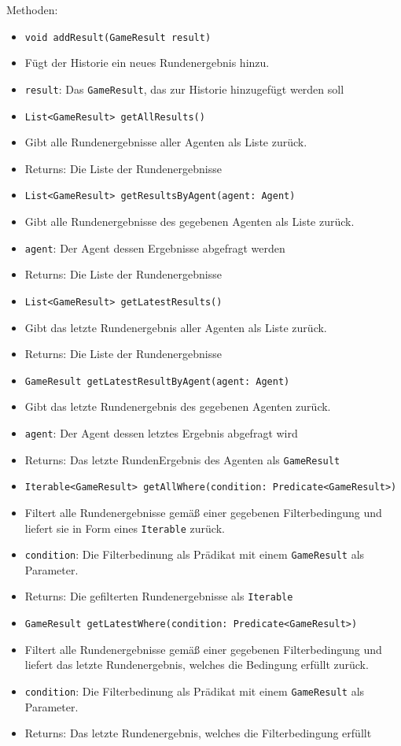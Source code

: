 \documentclass[parskip=full,11pt]{scrartcl}
\begin{document}
Methoden:
\begin{itemize}\itemsep -10pt
	\item \texttt{void addResult(GameResult result)}
	\item[] Fügt der Historie ein neues Rundenergebnis hinzu.
	\item[] \texttt{result}: Das \texttt{GameResult}, das zur Historie hinzugefügt werden soll
	\item \texttt{List<GameResult> getAllResults()}
	\item[]Gibt alle Rundenergebnisse  aller Agenten als Liste zurück.
	\item[]Returns: Die Liste der Rundenergebnisse
	\item \texttt{List<GameResult> getResultsByAgent(agent: Agent)}
	\item[]Gibt alle Rundenergebnisse des gegebenen Agenten als Liste zurück.
	\item[] \texttt{agent}: Der Agent dessen Ergebnisse abgefragt werden
	\item[]Returns: Die Liste der Rundenergebnisse
	\item \texttt{List<GameResult> getLatestResults()}
	\item[]Gibt das letzte Rundenergebnis aller Agenten als Liste zurück.
	\item[]Returns: Die Liste der Rundenergebnisse
	\item \texttt{GameResult getLatestResultByAgent(agent: Agent)}
	\item[] Gibt das letzte Rundenergebnis des gegebenen Agenten zurück.
	\item[] \texttt{agent}: Der Agent dessen letztes Ergebnis abgefragt wird
	\item[]Returns: Das letzte RundenErgebnis des Agenten als \texttt{GameResult}
	\item \texttt{Iterable<GameResult> getAllWhere(condition: Predicate<GameResult>)}
	\item[] Filtert alle Rundenergebnisse gemäß einer gegebenen Filterbedingung und liefert sie in Form eines \texttt{Iterable} zurück.
	\item[]\texttt{condition}: Die Filterbedinung als Prädikat mit einem \texttt{GameResult} als Parameter.
	\item[]Returns: Die gefilterten Rundenergebnisse als \texttt{Iterable}
	\item \texttt{GameResult getLatestWhere(condition: Predicate<GameResult>)}
	\item[] Filtert alle Rundenergebnisse gemäß einer gegebenen Filterbedingung und liefert das letzte Rundenergebnis, welches die Bedingung erfüllt zurück.
	\item[]\texttt{condition}: Die Filterbedinung als Prädikat mit einem \texttt{GameResult} als Parameter.
	\item[]Returns: Das letzte Rundenergebnis, welches die Filterbedingung erfüllt
\end{itemize}
\end{document}

